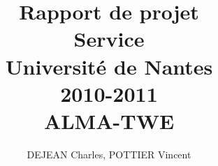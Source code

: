 \documentclass[12pt,a4paper,utf8x]{report}
\title
{
	\normalsize{Rapport de projet\\
	Service\\
	Université de Nantes\\
	2010-2011}\\
	\vspace{15mm}
	\Huge{ALMA-TWE}
}
\author{DEJEAN Charles, POTTIER Vincent\\
	\vspace{45mm}
}
\begin{document}
\maketitle
%

\tableofcontents
\clearpage

\begin{onehalfspace}






\end{onehalfspace}

% 
% 
% 

\printindex

\appendix
\end{document}

